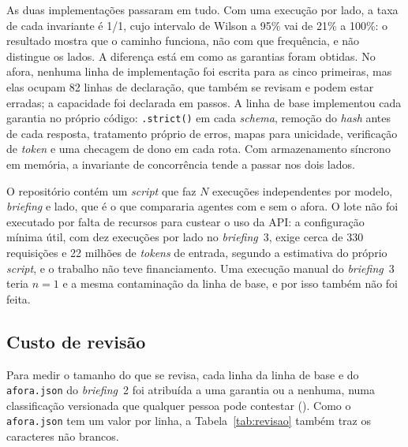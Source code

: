 \documentclass[a4paper,12pt]{article}
\newcommand{\estr}[1]{\textit{#1}}
\begin{document}
As duas implementações passaram em tudo. Com uma execução por lado, a taxa de cada invariante é 1/1, cujo intervalo de Wilson a 95\% vai de 21\% a 100\%: o resultado mostra que o caminho funciona, não com que frequência, e não distingue os lados. A diferença está em como as garantias foram obtidas. No afora, nenhuma linha de implementação foi escrita para as cinco primeiras, mas elas ocupam 82 linhas de declaração, que também se revisam e podem estar erradas; a capacidade foi declarada em passos. A linha de base implementou cada garantia no próprio código: \texttt{.strict()} em cada \estr{schema}, remoção do \estr{hash} antes de cada resposta, tratamento próprio de erros, mapas para unicidade, verificação de \estr{token} e uma checagem de dono em cada rota. Com armazenamento síncrono em memória, a invariante de concorrência tende a passar nos dois lados.

O repositório contém um \estr{script} que faz $N$ execuções independentes por modelo, \estr{briefing} e lado, que é o que compararia agentes com e sem o afora. O lote não foi executado por falta de recursos para custear o uso da API: a configuração mínima útil, com dez execuções por lado no \estr{briefing}~3, exige cerca de 330 requisições e 22 milhões de \estr{tokens} de entrada, segundo a estimativa do próprio \estr{script}, e o trabalho não teve financiamento. Uma execução manual do \estr{briefing}~3 teria $n = 1$ e a mesma contaminação da linha de base, e por isso também não foi feita.

\subsection{Custo de revisão}\label{sec:revisao}

Para medir o tamanho do que se revisa, cada linha da linha de base e do \texttt{afora.json} do \estr{briefing}~2 foi atribuída a uma garantia ou a nenhuma, numa classificação versionada que qualquer pessoa pode contestar (). Como o \texttt{afora.json} tem um valor por linha, a Tabela~\ref{tab:revisao} também traz os caracteres não brancos.
\end{document}

